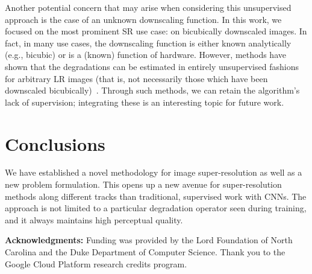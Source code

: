 \documentclass[10pt,twocolumn,letterpaper]{article}
\begin{document}
Another potential concern that may arise when considering this unsupervised approach is the case of an unknown downscaling function. In this work, we focused on the most prominent SR use case: on bicubically downscaled images. In fact, in many use cases, the downscaling function is either known analytically (e.g., bicubic) or is a (known) function of hardware. However, methods have shown that the degradations can be estimated in entirely unsupervised fashions for arbitrary LR images (that is, not necessarily those which have been downscaled bicubically)~\cite{bulat2018learn,zhao2018unsupervised}. Through such methods, we can retain the algorithm's lack of supervision; integrating these is an interesting topic for future work.

\section{Conclusions}

We have established a novel methodology for image super-resolution as well as a new problem formulation. This opens up a new avenue for super-resolution methods along different tracks than traditional, supervised work with CNNs. The approach is not limited to a particular degradation operator seen during training, and it always maintains high perceptual quality. 


\vspace*{5pt}
\noindent\textbf{Acknowledgments:}
Funding was provided by the Lord Foundation of North Carolina and the Duke Department of Computer Science. Thank you to the Google Cloud Platform research credits program.


{


}

\pagebreak
\end{document}
